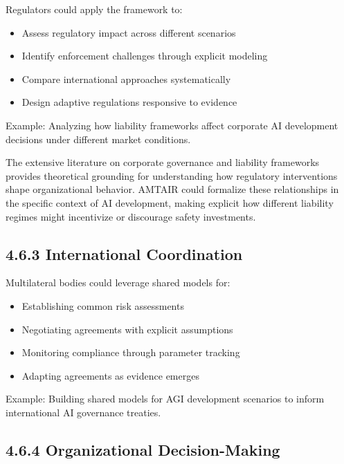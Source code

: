 \documentclass[
  11pt,
  letterpaper,
]{book}
\providecommand{\tightlist}{%
  \setlength{\itemsep}{0pt}\setlength{\parskip}{0pt}}
\begin{document}
Regulators could apply the framework to:

\begin{itemize}
\tightlist
\item
  Assess regulatory impact across different scenarios
\item
  Identify enforcement challenges through explicit modeling
\item
  Compare international approaches systematically
\item
  Design adaptive regulations responsive to evidence
\end{itemize}

Example: Analyzing how liability frameworks affect corporate AI
development decisions under different market conditions.

The extensive literature on corporate governance and liability
frameworks \textcite{cuomo2016} \textcite{demirag2000}
\textcite{devilliers2021} \textcite{divito2022} \textcite{kaur2024}
\textcite{list2011} \textcite{solomon2020} provides theoretical
grounding for understanding how regulatory interventions shape
organizational behavior. AMTAIR could formalize these relationships in
the specific context of AI development, making explicit how different
liability regimes might incentivize or discourage safety investments.

\subsection{4.6.3 International
Coordination}\label{sec-international-integration}

Multilateral bodies could leverage shared models for:

\begin{itemize}
\tightlist
\item
  Establishing common risk assessments
\item
  Negotiating agreements with explicit assumptions
\item
  Monitoring compliance through parameter tracking
\item
  Adapting agreements as evidence emerges
\end{itemize}

Example: Building shared models for AGI development scenarios to inform
international AI governance treaties.

\subsection{4.6.4 Organizational
Decision-Making}\label{sec-organizational-integration}
\end{document}
